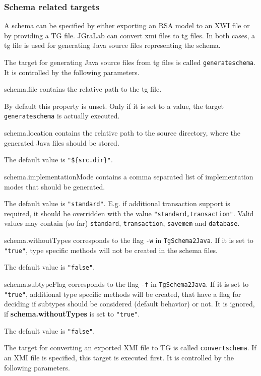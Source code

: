 \documentclass[a4paper,twoside,11pt,bibtotoc]{article}
\begin{document}
\subsubsection{Schema related targets}
A schema can be specified by either exporting an RSA model to an XWI file or by providing a TG file.
JGraLab can convert xmi files to tg files.
In both cases, a tg file is used for generating Java source files representing the schema.

The target for generating Java source files from tg files is called \texttt{generateschema}.
It is controlled by the following parameters.

\begin{description*}
	\item[schema.file] contains the relative path to the tg file.\par By default this property is unset. Only if it is set to a value, the target \texttt{generateschema} is actually executed.
	\item[schema.location] contains the relative path to the source directory, where the generated Java files should be stored.\par The default value is \texttt{"\$\{src.dir\}"}.
	\item[schema.implementationMode] contains a comma separated list of implementation modes that should be generated.\par The default value is \texttt{"standard"}. E.g. if additional transaction support is required, it should be overridden with the value \texttt{"standard,transaction"}. Valid values may contain (so-far) \texttt{standard}, \texttt{transaction}, \texttt{savemem} and \texttt{database}.
	\item[schema.withoutTypes] corresponds to the flag \texttt{-w} in \texttt{TgSchema2Java}. If it is set to \texttt{"true"}, type specific methods will not be created in the schema files.\par The default value is \texttt{"false"}.
	\item[schema.subtypeFlag] corresponds to the flag \texttt{-f} in \texttt{TgSchema2Java}. If it is set to \texttt{"true"}, additional type specific methods will be created, that have a flag for deciding if subtypes should be considered (default behavior) or not. It is ignored, if \textbf{schema.withoutTypes} is set to \texttt{"true"}.\par The default value is \texttt{"false"}.
\end{description*}

The target for converting an exported XMI file to TG is called \texttt{convertschema}.
If an XMI file is specified, this target is executed first.
It is controlled by the following parameters.
\end{document}
